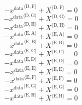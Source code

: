 \begin{equation}
-{x^{\mathrm{data}}}^{\langle \mathrm{\mathrm{D}},\mathrm{\mathrm{F}}\rangle} + {X}^{\langle \mathrm{D},\mathrm{F}\rangle} = 0
\end{equation}
\begin{equation}
-{x^{\mathrm{data}}}^{\langle \mathrm{\mathrm{D}},\mathrm{\mathrm{G}}\rangle} + {X}^{\langle \mathrm{D},\mathrm{G}\rangle} = 0
\end{equation}
\begin{equation}
-{x^{\mathrm{data}}}^{\langle \mathrm{\mathrm{D}},\mathrm{\mathrm{H}}\rangle} + {X}^{\langle \mathrm{D},\mathrm{H}\rangle} = 0
\end{equation}
\begin{equation}
-{x^{\mathrm{data}}}^{\langle \mathrm{\mathrm{E}},\mathrm{\mathrm{A}}\rangle} + {X}^{\langle \mathrm{E},\mathrm{A}\rangle} = 0
\end{equation}
\begin{equation}
-{x^{\mathrm{data}}}^{\langle \mathrm{\mathrm{E}},\mathrm{\mathrm{B}}\rangle} + {X}^{\langle \mathrm{E},\mathrm{B}\rangle} = 0
\end{equation}
\begin{equation}
-{x^{\mathrm{data}}}^{\langle \mathrm{\mathrm{E}},\mathrm{\mathrm{C}}\rangle} + {X}^{\langle \mathrm{E},\mathrm{C}\rangle} = 0
\end{equation}
\begin{equation}
-{x^{\mathrm{data}}}^{\langle \mathrm{\mathrm{E}},\mathrm{\mathrm{D}}\rangle} + {X}^{\langle \mathrm{E},\mathrm{D}\rangle} = 0
\end{equation}
\begin{equation}
-{x^{\mathrm{data}}}^{\langle \mathrm{\mathrm{E}},\mathrm{\mathrm{E}}\rangle} + {X}^{\langle \mathrm{E},\mathrm{E}\rangle} = 0
\end{equation}
\begin{equation}
-{x^{\mathrm{data}}}^{\langle \mathrm{\mathrm{E}},\mathrm{\mathrm{F}}\rangle} + {X}^{\langle \mathrm{E},\mathrm{F}\rangle} = 0
\end{equation}
\begin{equation}
-{x^{\mathrm{data}}}^{\langle \mathrm{\mathrm{E}},\mathrm{\mathrm{G}}\rangle} + {X}^{\langle \mathrm{E},\mathrm{G}\rangle} = 0
\end{equation}
\begin{equation}
-{x^{\mathrm{data}}}^{\langle \mathrm{\mathrm{E}},\mathrm{\mathrm{H}}\rangle} + {X}^{\langle \mathrm{E},\mathrm{H}\rangle} = 0
\end{equation}
